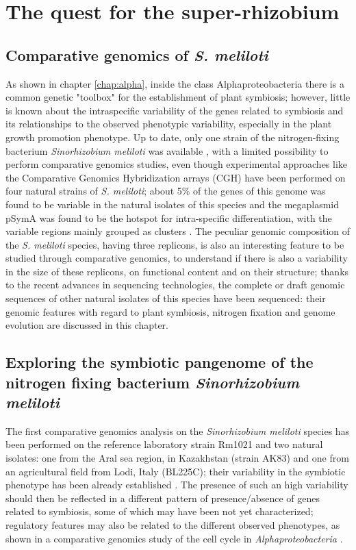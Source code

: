 \logvartrue
\chapter{The quest for the super-rhizobium}

\section{Comparative genomics of \textit{S. meliloti}}
As shown in chapter \ref{chap:alpha}, inside the class Alphaproteobacteria there is a common genetic "toolbox" for the establishment of plant symbiosis; however, little is known about the intraspecific variability of the genes related to symbiosis and its relationships to the observed phenotypic variability, especially in the plant growth promotion phenotype. Up to date, only one strain of the nitrogen-fixing bacterium \textit{Sinorhizobium meliloti} was available \cite{galibert2001composite}, with a limited possibility to perform comparative genomics studies, even though experimental approaches like the Comparative Genomics Hybridization arrays (CGH) have been performed on four natural strains of \textit{S. meliloti}; about 5\% of the genes of this genome was found to be variable in the natural isolates of this species and the megaplasmid pSymA was found to be the hotspot for intra-specific differentiation, with the variable regions mainly grouped as clusters \cite{giuntini2005large}. The peculiar genomic composition of the \textit{S. meliloti} species, having three replicons, is also an interesting feature to be studied through comparative genomics, to understand if there is also a variability in the size of these replicons, on functional content and on their structure; thanks to the recent advances in sequencing technologies, the complete or draft genomic sequences of other natural isolates of this species have been sequenced: their genomic features with regard to plant symbiosis, nitrogen fixation and genome evolution are discussed in this chapter.

\newpage
\section{Exploring the symbiotic pangenome of the nitrogen fixing bacterium \textit{Sinorhizobium meliloti}}
The first comparative genomics analysis on the \textit{Sinorhizobium meliloti} species has been performed on the reference laboratory strain Rm1021 and two natural isolates: one from the Aral sea region, in Kazakhstan (strain AK83) and one from an agricultural field from Lodi, Italy (BL225C); their 
variability in the symbiotic phenotype has been already established \cite{biondi2009metabolic}. The presence of such an high variability should then be reflected in a different pattern of presence/absence of genes related to symbiosis, some of which may have been not yet characterized; regulatory features may also be related to the different observed phenotypes, as shown in a comparative genomics study of the cell cycle in \textit{Alphaproteobacteria} \cite{brilli2010diversity}.

